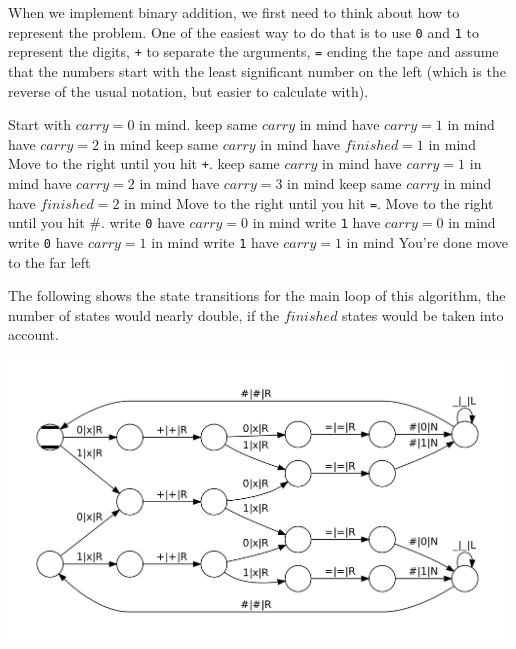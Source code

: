 \begin{example}
	When we implement binary addition, we first need to think about how to 
	represent the problem. One of the easiest way to do that is to use {\tt 0} 
	and {\tt 1} to represent the digits, {\tt +} to separate the arguments, 
	{\tt =} ending the tape and assume that the numbers start with the least
	significant number on the left (which is the reverse of the usual notation,
	but easier to calculate with).
	
	\begin{algorithmic}[1]
		\State Start with $carry=0$ in mind.
				\State keep same $carry$ in mind
				\State have $carry=1$ in mind
				\State have $carry=2$ in mind
			\EndIf
			\State keep same $carry$ in mind
			\State have $finished = 1$ in mind
		\EndIf
		\State Move to the right until you hit {\tt +}.
				\State keep same $carry$ in mind
				\State have $carry=1$ in mind
				\State have $carry=2$ in mind
				\State have $carry=3$ in mind
			\EndIf
			\State keep same $carry$ in mind
				\State have $finished = 2$ in mind
			\EndIf
		\EndIf
		\State Move to the right until you hit {\tt =}.
		\State Move to the right until you hit \#.
			\State write {\tt 0}
			\State have $carry=0$ in mind
			\State write {\tt 1}
			\State have $carry=0$ in mind
			\State write {\tt 0}
			\State have $carry=1$ in mind
			\State write {\tt 1}
			\State have $carry=1$ in mind
		\EndIf
			\State You're done
		\Else
			\State move to the far left
		\EndIf
	\end{algorithmic}
	The following shows the state transitions for the main loop of this 
	algorithm, the number of states would nearly double, if the $finished$ 
	states would be taken into account.

	\begin{center}
		\includegraphics[width=0.99\textwidth]{computability/completeness/pictures/binary-adder}
	\end{center}
\end{example}

